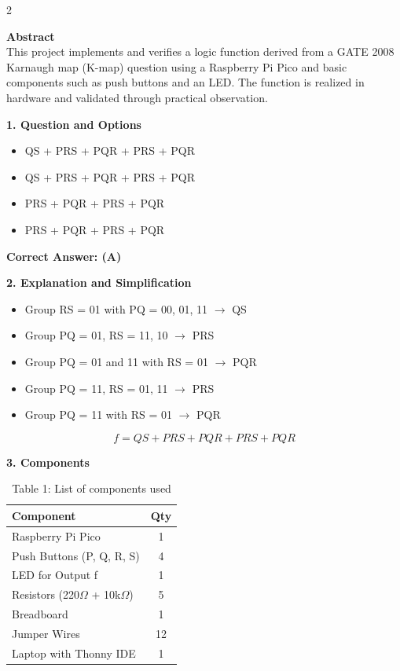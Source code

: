 \documentclass[12pt]{article}
\begin{document}
\begin{multicols}{2}

\noindent\textbf{Abstract} \\[0.5em]
This project implements and verifies a logic function derived from a GATE 2008 Karnaugh map (K-map) question using a Raspberry Pi Pico and basic components such as push buttons and an LED. The function is realized in hardware and validated through practical observation.

\vspace{1em}
\noindent\textbf{1. Question and Options}
\begin{itemize}
  \item[(A)] QS + PRS + PQR + PRS + PQR
  \item[(B)] QS + PRS + PQR + PRS + PQR
  \item[(C)] PRS + PQR + PRS + PQR
  \item[(D)] PRS + PQR + PRS + PQR
\end{itemize}
\textbf{Correct Answer: (A)}

\vspace{1em}
\noindent\textbf{2. Explanation and Simplification}
\begin{itemize}
    \item Group RS = 01 with PQ = 00, 01, 11 $\rightarrow$ QS
    \item Group PQ = 01, RS = 11, 10 $\rightarrow$ PRS
    \item Group PQ = 01 and 11 with RS = 01 $\rightarrow$ PQR
    \item Group PQ = 11, RS = 01, 11 $\rightarrow$ PRS
    \item Group PQ = 11 with RS = 01 $\rightarrow$ PQR
\end{itemize}
\[
f = QS + PRS + PQR + PRS + PQR
\]

\vspace{1em}
\noindent\textbf{3. Components}
\begin{table}[H]
\small
\centering
\begin{tabular}{|p{4.2cm}|c|}
\hline
\textbf{Component} & \textbf{Qty} \\
\hline
Raspberry Pi Pico & 1 \\
Push Buttons (P, Q, R, S) & 4 \\
LED for Output f & 1 \\
Resistors (220$\Omega$ + 10k$\Omega$) & 5 \\
Breadboard & 1 \\
Jumper Wires & 12 \\
Laptop with Thonny IDE & 1 \\
\hline
\end{tabular}
\caption*{Table 1: List of components used}
\end{table}


\end{multicols}
\end{document}
